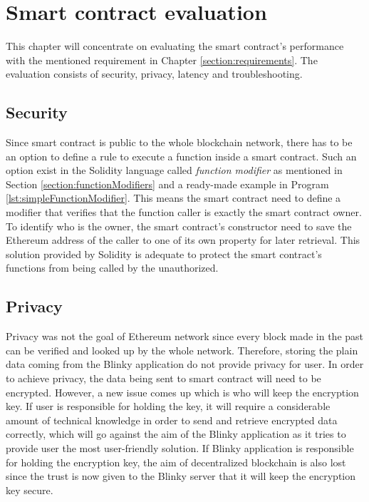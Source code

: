 \chapter{Smart contract evaluation}
\label{ch:evaluation}

This chapter will concentrate on evaluating the smart contract's performance with the mentioned requirement in Chapter \ref{section:requirements}. The evaluation consists of security, privacy, latency and troubleshooting.

\section{Security}
\label{section:security}

Since smart contract is public to the whole blockchain network, there has to be an option to define a rule to execute a function inside a smart contract. Such an option exist in the Solidity language called \textit{function modifier} as mentioned in Section \ref{section:functionModifiers} and a ready-made example in Program \ref{lst:simpleFunctionModifier}. This means the smart contract need to define a modifier that verifies that the function caller is exactly the smart contract owner. To identify who is the owner, the smart contract's constructor need to save the Ethereum address of the caller to one of its own property for later retrieval. This solution provided by Solidity is adequate to protect the smart contract's functions from being called by the unauthorized.

\section{Privacy}

Privacy was not the goal of Ethereum network since every block made in the past can be verified and looked up by the whole network. Therefore, storing the plain data coming from the Blinky application do not provide privacy for user. In order to achieve privacy, the data being sent to smart contract will need to be encrypted. However, a new issue comes up which is who will keep the encryption key. If user is responsible for holding the key, it will require a considerable amount of technical knowledge in order to send and retrieve encrypted data correctly, which will go against the aim of the Blinky application as it tries to provide user the most user-friendly solution. If Blinky application is responsible for holding the encryption key, the aim of decentralized blockchain is also lost since the trust is now given to the Blinky server that it will keep the encryption key secure.

